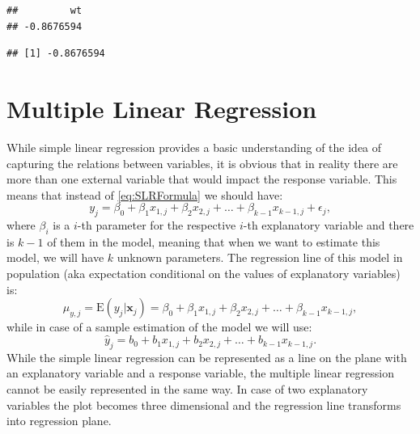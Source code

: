 \documentclass[
]{book}
\newenvironment{Shaded}{\begin{snugshade}}{\end{snugshade}}
\newcommand{\FunctionTok}[1]{\textcolor[rgb]{0.00,0.00,0.00}{#1}}
\newcommand{\NormalTok}[1]{#1}
\newcommand{\SpecialCharTok}[1]{\textcolor[rgb]{0.00,0.00,0.00}{#1}}
\theoremstyle{definition}
\theoremstyle{definition}
\theoremstyle{definition}
\theoremstyle{definition}
\theoremstyle{remark}
\begin{document}
\begin{verbatim}
##         wt 
## -0.8676594
\end{verbatim}

\begin{Shaded}
\end{Shaded}

\begin{verbatim}
## [1] -0.8676594
\end{verbatim}

\hypertarget{linearRegression}{%
\chapter{Multiple Linear Regression}\label{linearRegression}}

While simple linear regression provides a basic understanding of the idea of capturing the relations between variables, it is obvious that in reality there are more than one external variable that would impact the response variable. This means that instead of \eqref{eq:SLRFormula} we should have:
\begin{equation}
    y_j = \beta_0 + \beta_1 x_{1,j} + \beta_2 x_{2,j} + \dots + \beta_{k-1} x_{k-1,j} + \epsilon_j ,
    \label{eq:MLRFormula}
\end{equation}
where \(\beta_i\) is a \(i\)-th parameter for the respective \(i\)-th explanatory variable and there is \(k-1\) of them in the model, meaning that when we want to estimate this model, we will have \(k\) unknown parameters. The regression line of this model in population (aka expectation conditional on the values of explanatory variables) is:
\begin{equation}
    \mu_{y,j} = \mathrm{E}(y_j | \mathbf{x}_j) = \beta_0 + \beta_1 x_{1,j} + \beta_2 x_{2,j} + \dots + \beta_{k-1} x_{k-1,j} ,
    \label{eq:MLRExpectation}
\end{equation}
while in case of a sample estimation of the model we will use:
\begin{equation}
    \hat{y}_j = b_0 + b_1 x_{1,j} + b_2 x_{2,j} + \dots + b_{k-1} x_{k-1,j} .
    \label{eq:MLRExpectationSample}
\end{equation}
While the simple linear regression can be represented as a line on the plane with an explanatory variable and a response variable, the multiple linear regression cannot be easily represented in the same way. In case of two explanatory variables the plot becomes three dimensional and the regression line transforms into regression plane.
\end{document}
